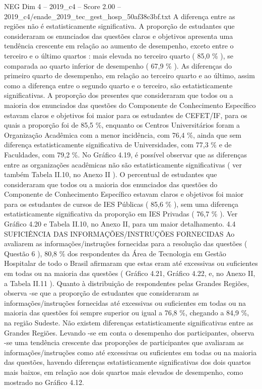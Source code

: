\begin{textsample}{NEG Dim 4 – 2019\_c4 – Score 2.00 – 2019\_c4/enade\_2019\_tec\_gest\_hosp\_50af38c3bf.txt}
A diferença entre as regiões não é estatisticamente significativa.
A proporção de estudantes que consideraram os enunciados das questões claros e objetivos apresenta uma tendência crescente em relação ao aumento de desempenho, exceto entre o terceiro e o último quartos : mais elevada no terceiro quarto ( 85,0 \% ), se comparada ao quarto inferior de desempenho ( 67,9 \% ).
As diferenças do primeiro quarto de desempenho, em relação ao terceiro quarto e ao último, assim como a diferença entre o segundo quarto e o terceiro, são estatisticamente significativas.
A proporção dos presentes que consideraram que todos ou a maioria dos enunciados das questões do Componente de Conhecimento Específico estavam claros e objetivos foi maior para os estudantes de CEFET/IF, para os quais a proporção foi de 85,5 \%, enquanto os Centros Universitários foram a Organização Acadêmica com a menor incidência, com 76,4 \%, ainda que sem diferença estatisticamente significativa de Universidades, com 77,3 \% e de Faculdades, com 79,2 \%.
No Gráfico 4.19, é possível observar que as diferenças entre as organizações acadêmicas não são estatisticamente significativas ( ver também Tabela II.10, no Anexo II ).
O percentual de estudantes que consideraram que todos ou a maioria dos enunciados das questões do Componente de Conhecimento Específico estavam claros e objetivos foi maior para os estudantes de cursos de IES Públicas ( 85,6 \% ), sem uma diferença estatisticamente significativa da proporção em IES Privadas ( 76,7 \% ).
Ver Gráfico 4.20 e Tabela II.10, no Anexo II, para um maior detalhamento. 4.4 SUFICIÊNCIA DAS INFORMAÇÕES/INSTRUÇÕES FORNECIDAS Ao avaliarem as informações/instruções fornecidas para a resolução das questões ( Questão 6 ), 80,8 \% dos respondentes da Área de Tecnologia em Gestão Hospitalar de todo o Brasil afirmaram que estas eram até excessivas ou suficientes em todas ou na maioria das questões ( Gráfico 4.21, Gráfico 4.22, e, no Anexo II, a Tabela II.11 ).
Quanto à distribuição de respondentes pelas Grandes Regiões, observa -se que a proporção de estudantes que consideraram as informações/instruções fornecidas até excessivas ou suficientes em todas ou na maioria das questões foi sempre superior ou igual a 76,8 \%, chegando a 84,9 \%, na região Sudeste.
Não existem diferenças estatisticamente significativas entre as Grandes Regiões.
Levando -se em conta o desempenho dos participantes, observa -se uma tendência crescente das proporções de participantes que avaliaram as informações/instruções como até excessivas ou suficientes em todas ou na maioria das questões, havendo diferenças estatisticamente significativas dos dois quartos mais baixos, em relação aos dois quartos mais elevados de desempenho, como mostrado no Gráfico 4.12.

\end{textsample}
